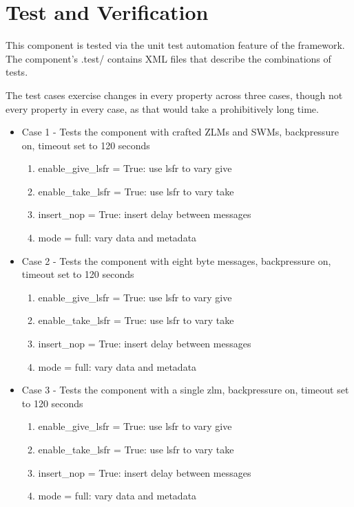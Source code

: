 \documentclass{article}
\begin{document}
\section*{Test and Verification}
\begin{flushleft}
This component is tested via the unit test automation feature of the framework. The component's .test/ contains XML files that describe the combinations of tests. \medskip

The test cases exercise changes in every property across three cases, though not every property in every case, as that would take a prohibitively long time.

\begin{itemize}
\item Case 1 - Tests the component with crafted ZLMs and SWMs, backpressure on, timeout set to 120 seconds
\begin{enumerate}
	\item enable\_give\_lsfr = True: use lsfr to vary give
	\item enable\_take\_lsfr = True: use lsfr to vary take
	\item insert\_nop = True: insert delay between messages
	\item mode = full: vary data and metadata
\end{enumerate}

\item Case 2 - Tests the component with eight byte messages, backpressure on, timeout set to 120 seconds
\begin{enumerate}
	\item enable\_give\_lsfr = True: use lsfr to vary give
	\item enable\_take\_lsfr = True: use lsfr to vary take
	\item insert\_nop = True: insert delay between messages
	\item mode = full: vary data and metadata
\end{enumerate}

\item Case 3 - Tests the component with a single zlm, backpressure on, timeout set to 120 seconds
\begin{enumerate}
	\item enable\_give\_lsfr = True: use lsfr to vary give
	\item enable\_take\_lsfr = True: use lsfr to vary take
	\item insert\_nop = True: insert delay between messages
	\item mode = full: vary data and metadata
\end{enumerate}


\end{itemize}
\end{flushleft}
\end{document}
